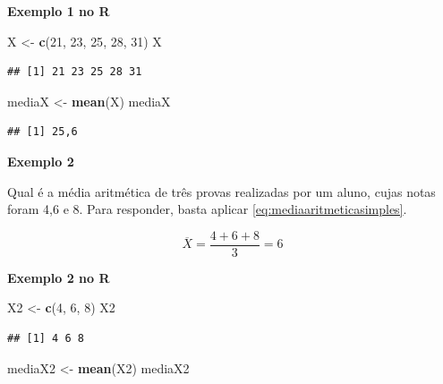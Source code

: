 \documentclass[
]{book}
\newenvironment{Shaded}{\begin{snugshade}}{\end{snugshade}}
\newcommand{\DecValTok}[1]{\textcolor[rgb]{0.00,0.00,0.81}{#1}}
\newcommand{\KeywordTok}[1]{\textcolor[rgb]{0.13,0.29,0.53}{\textbf{#1}}}
\newcommand{\NormalTok}[1]{#1}
\newcommand{\StringTok}[1]{\textcolor[rgb]{0.31,0.60,0.02}{#1}}
\begin{document}
\textbf{Exemplo 1 no R}

\begin{Shaded}
\begin{Highlighting}[]
\NormalTok{X <-}\StringTok{ }\KeywordTok{c}\NormalTok{(}\DecValTok{21}\NormalTok{, }\DecValTok{23}\NormalTok{, }\DecValTok{25}\NormalTok{, }\DecValTok{28}\NormalTok{, }\DecValTok{31}\NormalTok{)}
\NormalTok{X}
\end{Highlighting}
\end{Shaded}

\begin{verbatim}
## [1] 21 23 25 28 31
\end{verbatim}

\begin{Shaded}
\begin{Highlighting}[]
\NormalTok{mediaX <-}\StringTok{ }\KeywordTok{mean}\NormalTok{(X)}
\NormalTok{mediaX}
\end{Highlighting}
\end{Shaded}

\begin{verbatim}
## [1] 25,6
\end{verbatim}

\textbf{Exemplo 2}

Qual é a média aritmética de três provas realizadas por um aluno, cujas notas
foram 4,6 e 8. Para responder, basta aplicar \eqref{eq:mediaaritmeticasimples}.

\begin{equation*}
  \overline{X} = \frac{4+6+8}{3} = 6
\end{equation*}

\textbf{Exemplo 2 no R}

\begin{Shaded}
\begin{Highlighting}[]
\NormalTok{X2 <-}\StringTok{ }\KeywordTok{c}\NormalTok{(}\DecValTok{4}\NormalTok{, }\DecValTok{6}\NormalTok{, }\DecValTok{8}\NormalTok{)}
\NormalTok{X2}
\end{Highlighting}
\end{Shaded}

\begin{verbatim}
## [1] 4 6 8
\end{verbatim}

\begin{Shaded}
\begin{Highlighting}[]
\NormalTok{mediaX2 <-}\StringTok{ }\KeywordTok{mean}\NormalTok{(X2)}
\NormalTok{mediaX2}
\end{Highlighting}
\end{Shaded}
\end{document}
